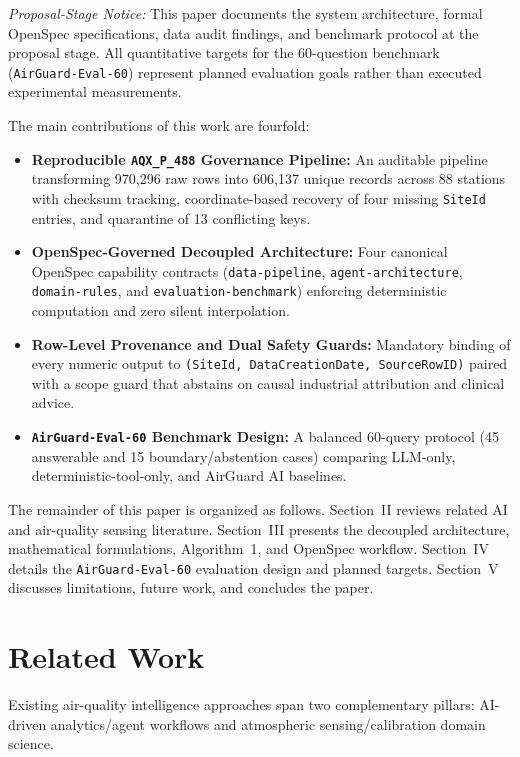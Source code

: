 \documentclass[conference]{IEEEtran}
\begin{document}
\emph{Proposal-Stage Notice:} This paper documents the system architecture, formal OpenSpec specifications, data audit findings, and benchmark protocol at the proposal stage. All quantitative targets for the 60-question benchmark (\texttt{AirGuard-Eval-60}) represent planned evaluation goals rather than executed experimental measurements.

The main contributions of this work are fourfold:
\begin{itemize}
    \item \textbf{Reproducible \texttt{AQX\_P\_488} Governance Pipeline:} An auditable pipeline transforming 970,296 raw rows into 606,137 unique records across 88 stations with checksum tracking, coordinate-based recovery of four missing \texttt{SiteId} entries, and quarantine of 13 conflicting keys.
    \item \textbf{OpenSpec-Governed Decoupled Architecture:} Four canonical OpenSpec capability contracts (\texttt{data-pipeline}, \texttt{agent-architecture}, \texttt{domain-rules}, and \texttt{evaluation-benchmark}) enforcing deterministic computation and zero silent interpolation.
    \item \textbf{Row-Level Provenance and Dual Safety Guards:} Mandatory binding of every numeric output to \texttt{(SiteId, DataCreationDate, SourceRowID)} paired with a scope guard that abstains on causal industrial attribution and clinical advice.
    \item \textbf{\texttt{AirGuard-Eval-60} Benchmark Design:} A balanced 60-query protocol (45 answerable and 15 boundary/abstention cases) comparing LLM-only, deterministic-tool-only, and AirGuard AI baselines.
\end{itemize}

The remainder of this paper is organized as follows. Section~II reviews related AI and air-quality sensing literature. Section~III presents the decoupled architecture, mathematical formulations, Algorithm~1, and OpenSpec workflow. Section~IV details the \texttt{AirGuard-Eval-60} evaluation design and planned targets. Section~V discusses limitations, future work, and concludes the paper.

\section{Related Work}
Existing air-quality intelligence approaches span two complementary pillars: AI-driven analytics/agent workflows and atmospheric sensing/calibration domain science.
\end{document}
